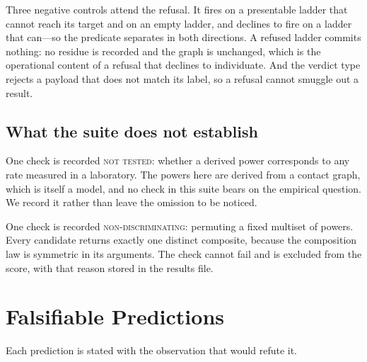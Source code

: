 \documentclass[11pt,twocolumn,a4paper]{article}
\theoremstyle{plain}
\theoremstyle{definition}
\theoremstyle{remark}
\begin{document}
Three negative controls attend the refusal. It fires on a presentable ladder
that cannot reach its target and on an empty ladder, and declines to fire on a
ladder that can---so the predicate separates in both directions. A refused
ladder commits nothing: no residue is recorded and the graph is unchanged,
which is the operational content of a refusal that declines to individuate.
And the verdict type rejects a payload that does not match its label, so a
refusal cannot smuggle out a result.

\subsection{What the suite does not establish}

One check is recorded \textsc{not tested}: whether a derived power corresponds
to any rate measured in a laboratory. The powers here are derived from a
contact graph, which is itself a model, and no check in this suite bears on the
empirical question. We record it rather than leave the omission to be noticed.

One check is recorded \textsc{non-discriminating}: permuting a fixed multiset
of powers. Every candidate returns exactly one distinct composite, because the
composition law is symmetric in its arguments. The check cannot fail and is
excluded from the score, with that reason stored in the results file.

\section{Falsifiable Predictions}
\label{sec:predictions}

Each prediction is stated with the observation that would refute it.
\end{document}
